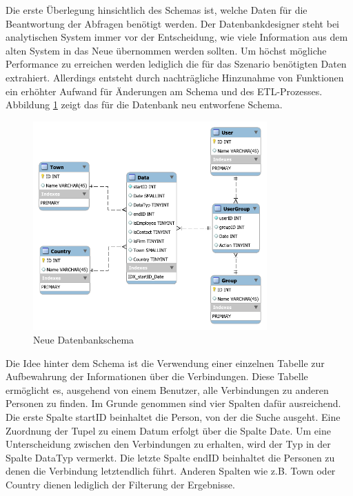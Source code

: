 Die erste Überlegung hinsichtlich des Schemas ist, welche Daten für die Beantwortung der Abfragen benötigt werden. Der Datenbankdesigner steht bei analytischen System immer vor der Entscheidung, wie viele Information aus dem alten System in das Neue übernommen werden sollten. Um höchst mögliche Performance zu erreichen werden lediglich die für das Szenario benötigten Daten extrahiert. Allerdings entsteht durch nachträgliche Hinzunahme von Funktionen ein erhöhter Aufwand für Änderungen am Schema und des ETL-Prozesses. Abbildung \ref{konzept_SchemaNeu} zeigt das für die Datenbank neu entworfene Schema. 

\begin{figure}[htbp]
\centering
  \includegraphics[width=0.8\textwidth, width=0.8\textwidth]{pics/NewSchema.pdf}
\caption{Neue Datenbankschema}
\label{konzept_SchemaNeu}
\end{figure} 

Die Idee hinter dem Schema ist die Verwendung einer einzelnen Tabelle zur Aufbewahrung der Informationen über die Verbindungen. Diese Tabelle ermöglicht es, ausgehend von einem Benutzer, alle Verbindungen zu anderen Personen zu finden. Im Grunde genommen sind vier Spalten dafür ausreichend. Die erste Spalte startID beinhaltet die Person, von der die Suche ausgeht. Eine Zuordnung der Tupel zu einem Datum erfolgt über die Spalte Date. Um eine Unterscheidung zwischen den Verbindungen zu erhalten, wird der Typ in der Spalte DataTyp vermerkt. Die letzte Spalte endID beinhaltet die Personen zu denen die Verbindung letztendlich führt. Anderen Spalten wie z.B. Town oder Country dienen lediglich der Filterung der Ergebnisse.

